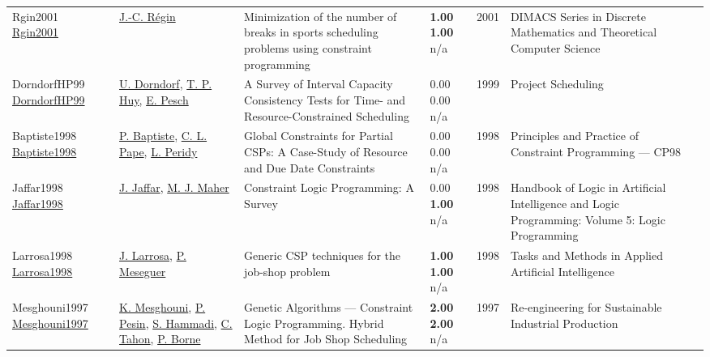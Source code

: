 {\begin{longtable}{p{3cm}p{5cm}p{10cm}p{1cm}rp{2.5cm}l}
Rgin2001 \href{http://dx.doi.org/10.1090/dimacs/057/07}{Rgin2001} & \hyperref[auth:a1420]{J.-C. Régin} & Minimization of the number of breaks in sports scheduling problems using constraint programming & \noindent{}\textbf{1.00} \textbf{1.00} n/a & 2001 & DIMACS Series in Discrete Mathematics and Theoretical Computer Science & \cite{Rgin2001}\\
DorndorfHP99 \href{http://dx.doi.org/10.1007/978-1-4615-5533-9_10}{DorndorfHP99} & \hyperref[auth:a904]{U. Dorndorf}, \hyperref[auth:a905]{T. P. Huy}, \hyperref[auth:a438]{E. Pesch} & A Survey of Interval Capacity Consistency Tests for Time- and Resource-Constrained Scheduling & \noindent{}\textcolor{black!50}{0.00} \textcolor{black!50}{0.00} n/a & 1999 & Project Scheduling & \cite{DorndorfHP99}\\
Baptiste1998 \href{http://dx.doi.org/10.1007/3-540-49481-2_8}{Baptiste1998} & \hyperref[auth:a162]{P. Baptiste}, \hyperref[auth:a163]{C. L. Pape}, \hyperref[auth:a1674]{L. Peridy} & Global Constraints for Partial CSPs: A Case-Study of Resource and Due Date Constraints & \noindent{}\textcolor{black!50}{0.00} \textcolor{black!50}{0.00} n/a & 1998 & Principles and Practice of Constraint Programming — CP98 & \cite{Baptiste1998}\\
Jaffar1998 \href{http://dx.doi.org/10.1093/oso/9780198537922.003.0012}{Jaffar1998} & \hyperref[auth:a1067]{J. Jaffar}, \hyperref[auth:a1068]{M. J. Maher} & Constraint Logic Programming: A Survey & \noindent{}\textcolor{black!50}{0.00} \textbf{1.00} n/a & 1998 & Handbook of Logic in Artificial Intelligence and Logic Programming: Volume 5: Logic Programming & \cite{Jaffar1998}\\
Larrosa1998 \href{http://dx.doi.org/10.1007/3-540-64574-8_390}{Larrosa1998} & \hyperref[auth:a1794]{J. Larrosa}, \hyperref[auth:a1795]{P. Meseguer} & \cellcolor{green!10}Generic CSP techniques for the job-shop problem & \noindent{}\textbf{1.00} \textbf{1.00} n/a & 1998 & Tasks and Methods in Applied Artificial Intelligence & \cite{Larrosa1998}\\
Mesghouni1997 \href{http://dx.doi.org/10.1007/978-0-387-35086-8_12}{Mesghouni1997} & \hyperref[auth:a1909]{K. Mesghouni}, \hyperref[auth:a1458]{P. Pesin}, \hyperref[auth:a1910]{S. Hammadi}, \hyperref[auth:a1459]{C. Tahon}, \hyperref[auth:a1911]{P. Borne} & Genetic Algorithms — Constraint Logic Programming. Hybrid Method for Job Shop Scheduling & \noindent{}\textbf{2.00} \textbf{2.00} n/a & 1997 & Re-engineering for Sustainable Industrial Production & \cite{Mesghouni1997}\\

\end{longtable}}
